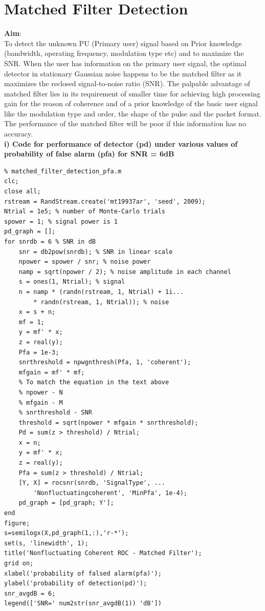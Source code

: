 \documentclass[a4paper]{article}
\begin{document}
\section{Matched Filter Detection}
\textbf{\large{Aim}}:\\[10pt]
To detect the unknown PU (Primary user) signal based on Prior knowledge
(bandwidth, operating frequency, modulation type etc) and to maximize the
SNR. When the user has information on the primary user signal, the optimal
detector in stationary Gaussian noise happens to be the matched filter as it
maximizes the reclosed signal-to-noise ratio (SNR). The palpable advantage
of matched filter lies in its requirement of smaller time for achieving high
processing gain for the reason of coherence and of a prior knowledge of the
basic user signal like the modulation type and order, the shape of the pulse
and the packet format. The performance of the matched filter will be poor if
this information has no accuracy.\\[10pt]
\textbf{i) Code for performance of detector (pd) under various values of probability
of false alarm (pfa) for SNR = 6dB}\\
\begin{verbatim}
% matched_filter_detection_pfa.m
clc;
close all;
rstream = RandStream.create('mt19937ar', 'seed', 2009);
Ntrial = 1e5; % number of Monte-Carlo trials
spower = 1; % signal power is 1
pd_graph = [];
for snrdb = 6 % SNR in dB
    snr = db2pow(snrdb); % SNR in linear scale
    npower = spower / snr; % noise power
    namp = sqrt(npower / 2); % noise amplitude in each channel
    s = ones(1, Ntrial); % signal
    n = namp * (randn(rstream, 1, Ntrial) + 1i...
        * randn(rstream, 1, Ntrial)); % noise
    x = s + n;
    mf = 1;
    y = mf' * x;
    z = real(y);
    Pfa = 1e-3;
    snrthreshold = npwgnthresh(Pfa, 1, 'coherent');
    mfgain = mf' * mf;
    % To match the equation in the text above
    % npower - N
    % mfgain - M
    % snrthreshold - SNR
    threshold = sqrt(npower * mfgain * snrthreshold);
    Pd = sum(z > threshold) / Ntrial;
    x = n;
    y = mf' * x;
    z = real(y);
    Pfa = sum(z > threshold) / Ntrial;
    [Y, X] = rocsnr(snrdb, 'SignalType', ...
        'Nonfluctuatingcoherent', 'MinPfa', 1e-4);
    pd_graph = [pd_graph; Y'];
end
figure;
s=semilogx(X,pd_graph(1,:),'r-*');
set(s, 'linewidth', 1);
title('Nonfluctuating Coherent ROC - Matched Filter');
grid on;
xlabel('probability of falsed alarm(pfa)');
ylabel('probability of detection(pd)');
snr_avgdB = 6;
legend(['SNR=' num2str(snr_avgdB(1)) 'dB'])
\end{verbatim}
\end{document}
